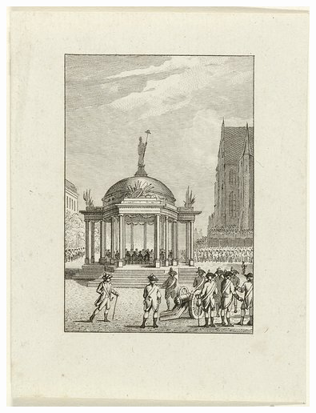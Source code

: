 \begin{figure}[!htb]
  \includegraphics[width=\linewidth]{./Images/Chapter03/example_2.jpg}
\endminipage
{}

\end{figure}
